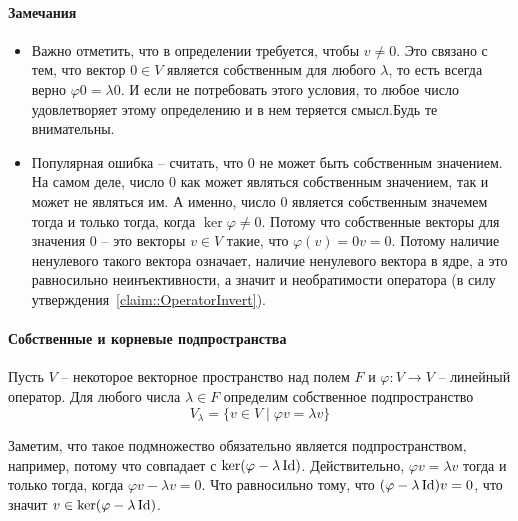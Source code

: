 \paragraph{Замечания}
\begin{itemize}
\item Важно отметить, что в определении требуется, чтобы $v\neq 0$. Это связано с тем, что вектор $0\in V$ является собственным для любого $\lambda$, то есть всегда верно $\varphi 0 = \lambda 0$. И если не потребовать этого условия, то любое число удовлетворяет этому определению и в нем теряется смысл.Будь те внимательны.

\item Популярная ошибка -- считать, что $0$ не может быть собственным значением. На самом деле, число $0$ как может являться собственным значением, так и может не являться им. А именно, число $0$ является собственным значемем тогда и только тогда, когда $\ker \varphi \neq 0$. Потому что собственные векторы для значения $0$ -- это векторы $v\in V$ такие, что $\varphi(v) = 0 v = 0$. Потому наличие ненулевого такого вектора означает, наличие ненулевого вектора в ядре, а это равносильно неинъективности, а значит и необратимости оператора (в силу утверждения~\ref{claim::OperatorInvert}).
\end{itemize}

\paragraph{Собственные и корневые подпространства}

\begin{definition}
Пусть $V$ -- некоторое векторное пространство над полем $F$ и $\varphi \colon V\to V$ -- линейный оператор. Для любого числа $\lambda \in F$ определим собственное подпространство
\[
V_\lambda = \{v\in V\mid \varphi v = \lambda v\}
\]
\end{definition}

Заметим, что такое подмножество обязательно является подпространством, например, потому что совпадает с $\ker (\varphi - \lambda \operatorname{Id})$. Действительно, $\varphi v = \lambda v$ тогда и только тогда, когда $\varphi v - \lambda v = 0$. Что равносильно тому, что $(\varphi - \lambda \operatorname{Id})v = 0$, что значит $v\in \ker(\varphi - \lambda \operatorname{Id})$.


